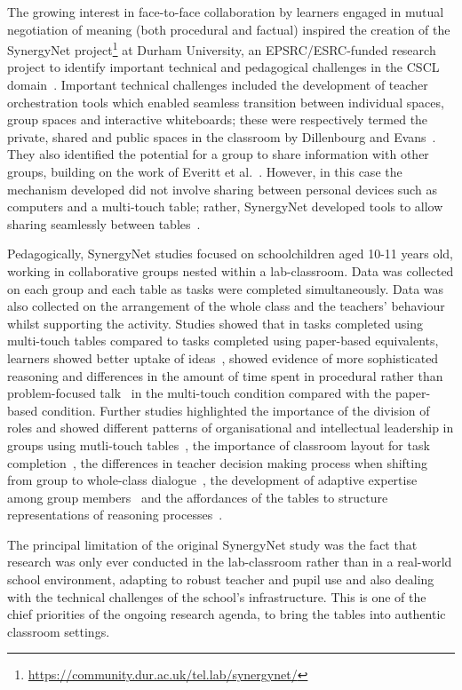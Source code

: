 \documentclass[a4paper,11pt]{article}
\begin{document}
The growing interest in face-to-face collaboration by learners engaged in mutual negotiation of meaning (both procedural and factual) inspired the creation of the SynergyNet project\footnote{\url{https://community.dur.ac.uk/tel.lab/synergynet/}} at Durham University, an EPSRC/ESRC-funded research project to identify important technical and pedagogical challenges in the CSCL domain~\cite{higgins-et-al:2012}.
Important technical challenges included the development of teacher orchestration tools which enabled seamless transition between individual spaces, group spaces and interactive whiteboards; these were respectively termed the private, shared and public spaces in the classroom by Dillenbourg and Evans~\cite{dillenbourg:2011}.
They also identified the potential for a group to share information with other groups, building on the work of Everitt et al.~\cite{everitt:2006}.
However, in this case the mechanism developed did not involve sharing between personal devices such as computers and a multi-touch table; rather, SynergyNet developed tools to allow sharing seamlessly between tables~\cite{hatch:2011b}.

Pedagogically, SynergyNet studies focused on schoolchildren aged 10-11 years old, working in collaborative groups nested within a lab-classroom.
Data was collected on each group and each table as tasks were completed simultaneously.
Data was also collected on the arrangement of the whole class and the teachers’ behaviour whilst supporting the activity.
Studies showed that in tasks completed using multi-touch tables compared to tasks completed using paper-based equivalents, learners showed better uptake of ideas~\cite{mercier:2015}, showed evidence of more sophisticated reasoning  and differences in the amount of time spent in procedural rather than problem-focused talk~\cite{higgins-et-al:2012} in the multi-touch condition compared with the paper-based condition.
Further studies highlighted the importance of the division of roles and showed different patterns of organisational and intellectual leadership in groups using mutli-touch tables~\cite{mercier2014d}, the importance of classroom layout for task completion~\cite{mercier:2014c}, the differences in teacher decision making process when shifting from group to whole-class dialogue~\cite{Joyce-Gibbons:2016}, the development of adaptive expertise among group members~\cite{mercier:2013} and the affordances of the tables to structure representations of reasoning processes~\cite{mercier:2014b}.

The principal limitation of the original SynergyNet study was the fact that research was only ever conducted in the lab-classroom rather than in a real-world school environment, adapting to robust teacher and pupil use and also dealing with the technical challenges of the school's infrastructure.
This is one of the chief priorities of the ongoing research agenda, to bring the tables into authentic classroom settings.
\end{document}
